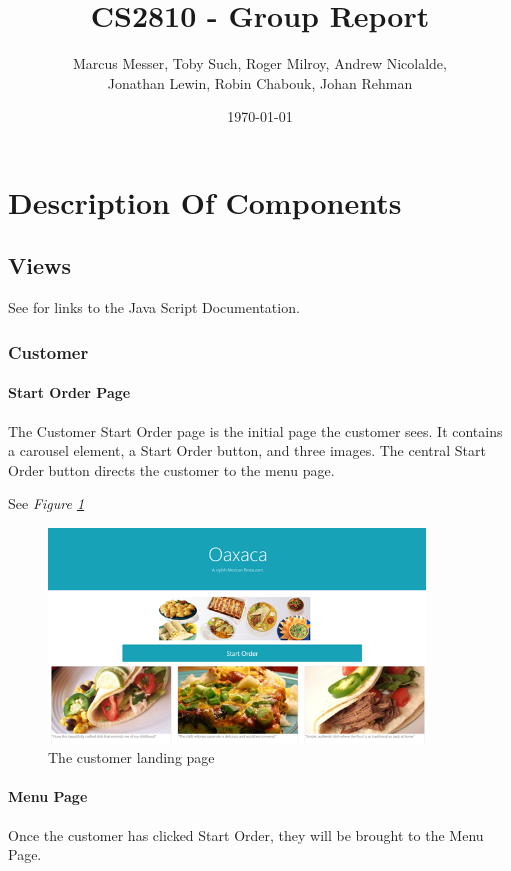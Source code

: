 \documentclass[12pt, twoside, a4paper]{report}
\title{CS2810 - Group Report}
\author{Marcus Messer, Toby Such, Roger Milroy, Andrew Nicolalde,\\
Jonathan Lewin, Robin Chabouk, Johan Rehman}
\date{\today}
\begin{document}
\maketitle
\pagestyle{fancy}
\fancyhf{}

\chapter*{Description Of Components}
\section*{Views}
See \textit{} for links to the Java Script Documentation.
\subsection*{Customer}
\subsubsection*{Start Order Page}
The Customer Start Order page is the initial page the customer sees.
It contains a carousel element, a Start Order button, and three images. The central Start Order button directs the customer to the menu page. 

See \textit{Figure \ref{fig:startOrder}}

\begin{figure}[H]
  \centering
  \includegraphics[width=10cm]{startOrder.png}
  \caption{The customer landing page}
  \label{fig:startOrder}
\end{figure}

\subsubsection*{Menu Page}
Once the customer has clicked Start Order, they will be brought to the Menu Page.
\end{document}
